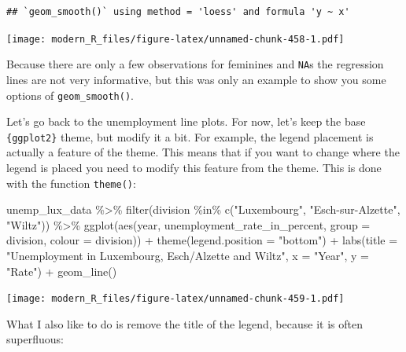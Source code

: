 \documentclass[
]{article}
\newenvironment{Shaded}{\begin{snugshade}}{\end{snugshade}}
\newcommand{\AttributeTok}[1]{\textcolor[rgb]{0.77,0.63,0.00}{#1}}
\newcommand{\FunctionTok}[1]{\textcolor[rgb]{0.00,0.00,0.00}{#1}}
\newcommand{\NormalTok}[1]{#1}
\newcommand{\SpecialCharTok}[1]{\textcolor[rgb]{0.00,0.00,0.00}{#1}}
\newcommand{\StringTok}[1]{\textcolor[rgb]{0.31,0.60,0.02}{#1}}
\begin{document}
\begin{verbatim}
## `geom_smooth()` using method = 'loess' and formula 'y ~ x'
\end{verbatim}

\texttt{[image: modern\_R\_files/figure-latex/unnamed-chunk-458-1.pdf]}

Because there are only a few observations for feminines and \texttt{NA}s the regression lines are not very informative,
but this was only an example to show you some options of \texttt{geom\_smooth()}.

Let's go back to the unemployment line plots. For now, let's keep the base \texttt{\{ggplot2\}} theme, but
modify it a bit. For example, the legend placement is actually a feature of the theme. This means
that if you want to change where the legend is placed you need to modify this feature from the
theme. This is done with the function \texttt{theme()}:

\begin{Shaded}
\begin{Highlighting}[]
\NormalTok{unemp\_lux\_data }\SpecialCharTok{\%\textgreater{}\%}
  \FunctionTok{filter}\NormalTok{(division }\SpecialCharTok{\%in\%} \FunctionTok{c}\NormalTok{(}\StringTok{"Luxembourg"}\NormalTok{, }\StringTok{"Esch{-}sur{-}Alzette"}\NormalTok{, }\StringTok{"Wiltz"}\NormalTok{)) }\SpecialCharTok{\%\textgreater{}\%}
  \FunctionTok{ggplot}\NormalTok{(}\FunctionTok{aes}\NormalTok{(year, unemployment\_rate\_in\_percent, }\AttributeTok{group =}\NormalTok{ division, }\AttributeTok{colour =}\NormalTok{ division)) }\SpecialCharTok{+}
  \FunctionTok{theme}\NormalTok{(}\AttributeTok{legend.position =} \StringTok{"bottom"}\NormalTok{) }\SpecialCharTok{+}
  \FunctionTok{labs}\NormalTok{(}\AttributeTok{title =} \StringTok{"Unemployment in Luxembourg, Esch/Alzette and Wiltz"}\NormalTok{, }\AttributeTok{x =} \StringTok{"Year"}\NormalTok{, }\AttributeTok{y =} \StringTok{"Rate"}\NormalTok{) }\SpecialCharTok{+}
  \FunctionTok{geom\_line}\NormalTok{()}
\end{Highlighting}
\end{Shaded}

\texttt{[image: modern\_R\_files/figure-latex/unnamed-chunk-459-1.pdf]}

What I also like to do is remove the title of the legend, because it is often superfluous:
\end{document}
